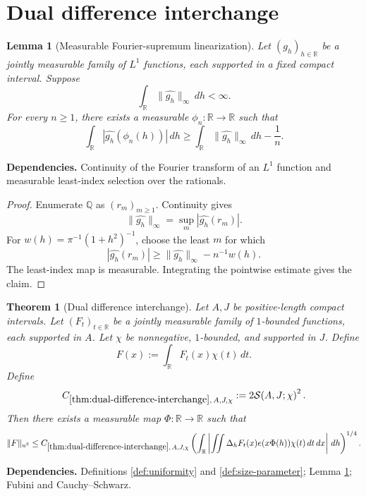 \documentclass[11pt]{article}
\newtheorem{theorem}{Theorem}[section]
\newtheorem{lemma}[lemma]{Lemma}
\theoremstyle{definition}
\theoremstyle{remark}
\newcommand{\R}{\mathbb R}
\newcommand{\1}{\mathbf 1}
\newcommand{\FT}[1]{\widehat{#1}}
\newcommand{\dd}{\,d}
\newcommand{\uNorm}[2]{\lVert #1\rVert_{u^{#2}}}
\newcommand{\lpNorm}[2]{\lVert #1\rVert_{#2}}
\newcommand{\uses}[1]{\par\smallskip\noindent\textbf{Dependencies.} #1\par\smallskip}
\newcommand{\Ssize}[2]{\mathcal S\!\left(#1;#2\right)}
\begin{document}
\section{Dual difference interchange}

\begin{lemma}[Measurable Fourier-supremum linearization]\label{lem:measurable-linearization}
Let $(g_h)_{h\in\R}$ be a jointly measurable family of $L^1$ functions, each supported in a fixed compact interval.  Suppose
\[
\int_\R\lpNorm{\FT{g_h}}\infty\dd h<\infty.
\]
For every $n\geq1$, there exists a measurable $\phi_n:\R\to\R$ such that
\[
\int_\R|\FT{g_h}(\phi_n(h))|\dd h
\geq
\int_\R\lpNorm{\FT{g_h}}\infty\dd h-\frac1n.
\]
\end{lemma}

\uses{Continuity of the Fourier transform of an $L^1$ function and measurable least-index selection over the rationals.}

\begin{proof}
Enumerate $\mathbb Q$ as $(r_m)_{m\geq1}$.  Continuity gives
\[
\lpNorm{\FT{g_h}}\infty=\sup_m|\FT{g_h}(r_m)|.
\]
For
$w(h)=\pi^{-1}(1+h^2)^{-1}$, choose the least $m$ for which
\[
|\FT{g_h}(r_m)|
\geq
\lpNorm{\FT{g_h}}\infty-n^{-1}w(h).
\]
The least-index map is measurable.  Integrating the pointwise estimate gives the claim.
\end{proof}

\begin{theorem}[Dual difference interchange]\label{thm:dual-difference-interchange}
Let $A,J$ be positive-length compact intervals.  Let $(F_t)_{t\in\R}$ be a jointly measurable family of $1$-bounded functions, each supported in $A$.  Let $\chi$ be nonnegative, $1$-bounded, and supported in $J$.  Define
\[
F(x):=\int_\R F_t(x)\chi(t)\dd t.
\]
Define
\[
C_{\ref{thm:dual-difference-interchange},\,A,J,\chi}
:=
2\Ssize{A,J}{\chi}^{2}.
\]
Then there exists a measurable map $\Phi:\R\to\R$ such that
\[
\uNorm F3
\leq
C_{\ref{thm:dual-difference-interchange},\,A,J,\chi}
\left(
\int_\R
\left|
\iint\Delta_hF_t(x)e(x\Phi(h))\chi(t)\dd t\dd x
\right|
\dd h
\right)^{1/4}.
\]
\end{theorem}

\uses{Definitions \ref{def:uniformity} and \ref{def:size-parameter}; Lemma \ref{lem:measurable-linearization}; Fubini and Cauchy--Schwarz.}
\end{document}
